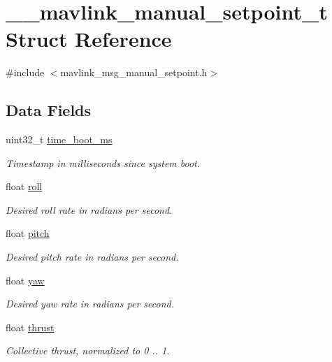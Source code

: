 \hypertarget{struct____mavlink__manual__setpoint__t}{\section{\+\_\+\+\_\+mavlink\+\_\+manual\+\_\+setpoint\+\_\+t Struct Reference}
\label{struct____mavlink__manual__setpoint__t}
}


{\ttfamily \#include $<$mavlink\+\_\+msg\+\_\+manual\+\_\+setpoint.\+h$>$}

\subsection*{Data Fields}
\begin{DoxyCompactItemize}
\item 
uint32\+\_\+t \hyperlink{struct____mavlink__manual__setpoint__t_aabfde5c1645ed2c5c0e3702cd3b7a63d}{time\+\_\+boot\+\_\+ms}
\begin{DoxyCompactList}\small\item\em Timestamp in milliseconds since system boot. \end{DoxyCompactList}\item 
float \hyperlink{struct____mavlink__manual__setpoint__t_ab0fe1187926dd2bbdfb30c2bdbffbeaf}{roll}
\begin{DoxyCompactList}\small\item\em Desired roll rate in radians per second. \end{DoxyCompactList}\item 
float \hyperlink{struct____mavlink__manual__setpoint__t_a17e3f9bb6707394163aafdbf02539694}{pitch}
\begin{DoxyCompactList}\small\item\em Desired pitch rate in radians per second. \end{DoxyCompactList}\item 
float \hyperlink{struct____mavlink__manual__setpoint__t_ab3e21184ffcf6b5451f8227d6ccb35bc}{yaw}
\begin{DoxyCompactList}\small\item\em Desired yaw rate in radians per second. \end{DoxyCompactList}\item 
float \hyperlink{struct____mavlink__manual__setpoint__t_a2044f740a7e79365a9edf603e5c29d3c}{thrust}
\begin{DoxyCompactList}\small\item\em Collective thrust, normalized to 0 .. 1. \end{DoxyCompactList}\item 

\end{DoxyCompactItemize}

